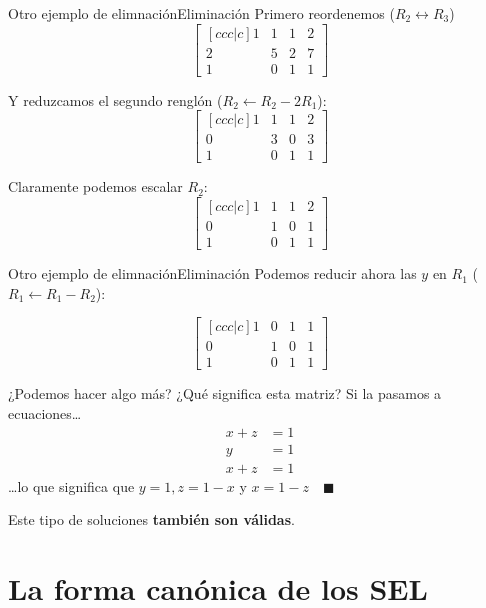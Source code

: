 \documentclass[spanish, c]{beamer}
\begin{document}
\begin{frame}{Otro ejemplo de elimnación}{Eliminación}
    Primero reordenemos ($R_2 \longleftrightarrow R_3$) \pause
    $$\begin{bmatrix}[ccc|c]
        1 & 1 & 1 & 2 \\
        2 & 5 & 2 & 7 \\
        1 & 0 & 1 & 1
    \end{bmatrix}$$ \pause

    Y reduzcamos el segundo renglón ($R_2 \gets R_2 - 2R_1$): \pause
    $$\begin{bmatrix}[ccc|c]
        1 & 1 & 1 & 2 \\
        0 & 3 & 0 & 3 \\
        1 & 0 & 1 & 1
    \end{bmatrix}$$ \pause

    Claramente podemos escalar $R_2$: \pause
    $$\begin{bmatrix}[ccc|c]
        1 & 1 & 1 & 2 \\
        0 & 1 & 0 & 1 \\
        1 & 0 & 1 & 1
    \end{bmatrix}$$
\end{frame}

\begin{frame}{Otro ejemplo de elimnación}{Eliminación}
    Podemos reducir ahora las $y$ en $R_1$ ($R_1 \gets R_1 - R_2$): \pause
    
    $$\begin{bmatrix}[ccc|c]
        1 & 0 & 1 & 1 \\
        0 & 1 & 0 & 1 \\
        1 & 0 & 1 & 1
    \end{bmatrix}$$ \pause

    ¿Podemos hacer algo más? \pause ¿Qué significa esta matriz? \pause
    Si la pasamos a ecuaciones\dots \pause
    \begin{align*}
        x + z & = 1 \\
        y & = 1 \\
        x + z & = 1
    \end{align*} \pause
    \dots lo que significa que $y=1, z = 1 - x$ y $x = 1 - z \quad \blacksquare$ \pause

    Este tipo de soluciones \textbf{también son válidas}.

\end{frame}

\section{La forma canónica de los SEL}
\end{document}
